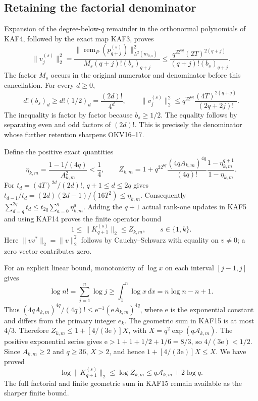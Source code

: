 \documentclass[11pt,a4paper]{article}
\begin{document}
\subsection{Retaining the factorial denominator}
Expansion of the degree-below-$q$ remainder in the orthonormal
polynomials of KAF4, followed by the exact map KAF3, proves
\[
 \|v_j^{(s)}\|_2^2
 =\frac{\|\operatorname{rem}_P(p_{q+j}^{(s)})\|_{L^2(m_{0,s})}^2}
          {M_s(q+j)!(b_s)_{q+j}}
 \le\frac{q^22^{6q}(2T)^{2(q+j)}}{(q+j)!(b_s)_{q+j}}.
 \tag{KAF13}
\]
The factor $M_s$ occurs in the original numerator and denominator
before this cancellation. For every $d\ge0$,
\[
 d!(b_s)_d\ge d!(1/2)_d=\frac{(2d)!}{4^d},
 \qquad
 \|v_j^{(s)}\|_2^2\le q^22^{6q}\frac{(4T)^{2(q+j)}}{(2q+2j)!}.
 \tag{KAF14}
\]
The inequality is factor by factor because $b_s\ge1/2$.
The equality follows by separating even and odd factors of $(2d)!$.
This is precisely the denominator whose further retention sharpens
OKV16--17.

Define the positive exact quantities
\[
 \eta_{k,m}=\frac{1-1/(4q)}{A_{k,m}^2}<\frac14,\qquad
 Z_{k,m}=1+q^22^{6q}\frac{(4qA_{k,m})^{4q}}{(4q)!}
              \frac{1-\eta_{k,m}^{q+1}}{1-\eta_{k,m}}.
 \tag{KAF15}
\]
For $t_d=(4T)^{2d}/(2d)!$, $q+1\le d\le2q$ gives
$t_{d-1}/t_d=(2d)(2d-1)/(16T^2)\le\eta_{k,m}$.
Consequently $\sum_{d=q}^{2q}t_d\le
t_{2q}\sum_{a=0}^q\eta_{k,m}^a$. Adding the $q+1$ actual rank-one
updates in KAF5 and using KAF14 proves the finite operator bound
\[
 \boxed{1\le\|K_{q+1}^{(s)}\|_2\le Z_{k,m},\qquad s\in\{1,k\}.}
 \tag{KAF16}
\]
Here $\|vv^*\|_2=\|v\|_2^2$ follows by Cauchy--Schwarz with
equality on $v\ne0$; a zero vector contributes zero.

For an explicit linear bound, monotonicity of $\log x$ on each
interval $[j-1,j]$ gives
\[
 \log n!=\sum_{j=1}^n\log j
       \ge\int_1^n\log x\,dx=n\log n-n+1.
\]
Thus $(4qA_{k,m})^{4q}/(4q)!\le
\mathrm e^{-1}(\mathrm e A_{k,m})^{4q}$, where $\mathrm e$ is
the exponential constant and differs from the primary integer $e_k$.
The geometric sum in KAF15 is at most $4/3$. Therefore
$Z_{k,m}\le1+[4/(3\mathrm e)]X$, with
$X=q^2\exp(q\mathcal A_{k,m})$. The positive exponential series
gives $\mathrm e>1+1+1/2+1/6=8/3$, so $4/(3\mathrm e)<1/2$.
Since $A_{k,m}\ge2$ and $q\ge36$, $X>2$, and hence
$1+[4/(3\mathrm e)]X\le X$. We have proved
\[
 \boxed{\log\|K_{q+1}^{(s)}\|_2\le\log Z_{k,m}
       \le q\mathcal A_{k,m}+2\log q.}
 \tag{KAF17}
\]
The full factorial and finite geometric sum in KAF15 remain available
as the sharper finite bound.
\end{document}
